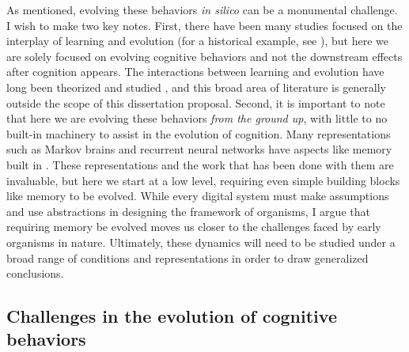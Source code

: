 As mentioned, evolving these behaviors \textit{in silico} can be a monumental challenge.
I wish to make two key notes. 
First, there have been many studies focused on the interplay of learning and evolution (for a historical example, see \citep{hinton1987learning}), but here we are solely focused on evolving cognitive behaviors and not the downstream effects after cognition appears.   
The interactions between learning and evolution have long been theorized and studied \citep{baldwinNewFactorEvolution1896}, and this broad area of literature is generally outside the scope of this dissertation proposal. 
Second, it is important to note that here we are evolving these behaviors \textit{from the ground up}, with little to no built-in machinery to assist in the evolution of cognition. 
Many representations such as Markov brains and recurrent neural networks have aspects like memory built in \citep{hintzeMarkovBrainsTechnical2017}. 
These representations and the work that has been done with them are invaluable, but here we start at a low level, requiring even simple building blocks like memory to be evolved. %
While every digital system must make assumptions and use abstractions in designing the framework of organisms, I argue that requiring memory be evolved moves us closer to the challenges faced by early organisms in nature. 
Ultimately, these dynamics will need to be studied under a broad range of conditions and representations in order to draw generalized conclusions.

\subsection{Challenges in the evolution of cognitive behaviors}


